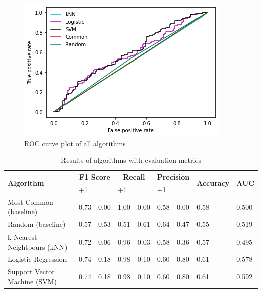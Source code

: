 \documentclass[transmag]{IEEEtran}
\begin{document}
\begin{figure}[h]
	\includegraphics[width=\columnwidth]{roc_curve.png} 
    \caption{ROC curve plot of all algorithms}%
    \label{fig:results_roc}%
\end{figure}

\begin{table}[!h]

\begin{tabularx}{\textwidth}{|| p{5cm} | X | X | X | X | X | X | X | X ||}
\hline
\multirow{2}{*}{\textbf{Algorithm}}  & \multicolumn{2}{c|}{\textbf{F1 Score}} & \multicolumn{2}{c|}{\textbf{Recall}} & \multicolumn{2}{c|}{\textbf{Precision}} & \multirow{2}{*}{\textbf{Accuracy}} & \multirow{2}{*}{\textbf{AUC}} \\ 
\cline{2-7}
& \centering +1& \centering -1 & \centering +1 & \centering -1 & \centering +1 & \centering -1 & & \\ 
\hline
Most Common (baseline) & 0.73 & 0.00 & 1.00 & 0.00 & 0.58 & 0.00 & 0.58 & 0.500 \\
\hline
Random (baseline) & 0.57 & 0.53 & 0.51 & 0.61 & 0.64 & 0.47 & 0.55 & 0.519 \\
\hline
k-Nearest Neightbours (kNN) & 0.72 & 0.06 & 0.96 & 0.03 & 0.58 & 0.36 & 0.57 & 0.495 \\
\hline
Logistic Regression & 0.74 & 0.18& 0.98 & 0.10 & 0.60 & 0.80 & 0.61 & 0.578 \\
\hline
Support Vector Machine (SVM) & 0.74 & 0.18 & 0.98 & 0.10 & 0.60 & 0.80 & 0.61 & 0.592 \\
\hline

\hline
\end{tabularx}
\caption{Results of algorithms with evaluation metrics}
    \label{tab:results}%
\end{table}
\end{document}
